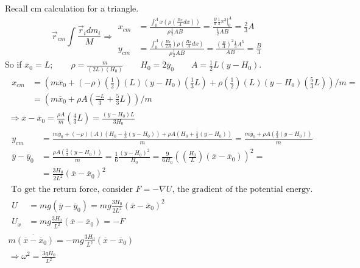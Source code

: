 \documentclass[twoside,10pt]{amsart}
\begin{document}
Recall cm calculation for a triangle.  
\[
\vec{r}_{cm} \int \frac{\vec{r}_i  dm_i }{ M } \Longrightarrow \begin{aligned}
x_{cm} & = \frac{ \int_0^A x \left( \rho \left( \frac{Bx}{A} dx \right) \right) }{ \rho \frac{1}{2} A B } = \frac{ \frac{B}{a} \frac{1}{3} \left. x^3  \right|_0^A }{ \frac{1}{2} AB } = \frac{2}{3} A \\
y_{cm} & = \frac{ \int_0^A \left( \frac{Bx}{2A} \right) \rho \left( \frac{Bx}{A} dx \right) }{ \rho \frac{1}{2} A B }  = \frac{ \left( \frac{B}{A} \right)^2 \frac{1}{3} A^3 }{ AB } = \frac{B}{3} 
\end{aligned}
\]
So if $\overline{x}_0 = L ; \quad \quad \rho = \frac{ m}{ (2L)(H_0) } \quad \quad H_0 = 2 \overline{y}_0 \quad \quad A = \frac{1}{2} L (y - H_0)$.  
\[
\begin{gathered}
  \begin{aligned}
    x_{cm} & = ( m \overline{x}_0 + (-\rho) \left( \frac{1}{2} \right) (L) (y-H_0) \left( \frac{1}{3} L \right) + \rho \left( \frac{1}{2} \right) (L) (y-H_0) \left( \frac{5}{3} L \right) )/m = \\
    & = (m \overline{x}_0 + \rho A \left( \frac{-L}{3} + \frac{5}{3} L \right) )/m 
\end{aligned} \\
  \Longrightarrow \overline{x} - \overline{x}_0 = \frac{\rho A}{m} \left( \frac{4}{3} L \right) = \frac{ (y-H_0)L}{ 3H_0} \\
\begin{aligned}
  y_{cm} & = \frac{ m \overline{y}_0 + (-\rho)(A) ( H_0 - \frac{1}{3} (y-H_0) ) + \rho A (H_0  + \frac{1}{3} (y - H_0 ) ) }{ m } = \frac{ m\overline{y}_0 + \rho A \left( \frac{2}{3} (y-H_0) \right) }{ m } \\
  \overline{y} - \overline{y}_0 & = \frac{ \rho A \left( \frac{2}{3} (y-H_0) \right) }{ m } = \frac{1}{6} \frac{ (y-H_0)^2}{ H_0 } = \frac{ 9 }{6H_0} \left( \left( \frac{H_0}{L} \right)( \overline{x} - \overline{x}_0 )\right)^2  = \\
  & = \frac{3H_0}{ 2 L^2} (\overline{x} - \overline{x}_0 )^2 
\end{aligned} \\
\text{ To get the return force, consider $F = -\nabla U$, the gradient of the potential energy. } \\
\begin{aligned}
  U & = mg (\overline{y} - \overline{y}_0) = mg \frac{3H_0}{2L^2} (\overline{x} - \overline{x}_0)^2 \\
  U_x & = mg \frac{3H_0}{L^2} (\overline{x} - \overline{x}_0 ) = -F 
\end{aligned} \\
m \ddot{ (\overline{x} - \overline{x}_0 ) } = -mg \frac{3H_0}{L^2} (\overline{x}- \overline{x}_0) \\
\Longrightarrow \boxed{ \omega^2 = \frac{ 3 g H_0}{ L^2 } }
\end{gathered}
\]
\end{document}
